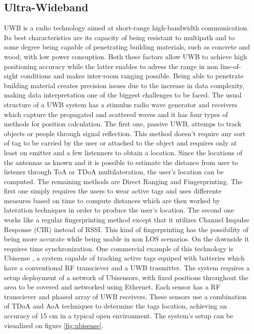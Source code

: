 \subsection{Ultra-Wideband}
\label{subsec:uwb}

\ac{UWB} is a radio technology aimed at short-range high-bandwidth communication. Its best characteristics are its capacity of being resistant to multipath and to some degree being capable of penetrating building materials, such as concrete and wood, with low power consuption. Both these factors allow \ac{UWB} to achieve high positioning accuracy while the latter enables to adress the range in non line-of-sight conditions and makes inter-room ranging possible. Being able to penetrate building material creates precision issues due to the increase in data complexity, making data interpretation one of the biggest challenges to be faced. The usual structure of a \ac{UWB} system has a stimulus radio wave generator and receivers which capture the propagated and scattered waves and it has four types of methods for position calculation.
The first one, passive \ac{UWB}, attemps to track objects or people through signal reflection. This method doesn't require any sort of tag to be carried by the user or attached to the object and requires only at least on emitter and a few listenners to obtain a location. Since the locations of the antennas as known and it is possible to estimate the distance from user to listener through \ac{ToA} or \ac{TDoA} multilateration, the user's location can be computed.
The remaining methods are Direct Ranging and Fingerprinting. The first one simply requires the users to wear active tags and uses differente measures based on time to compute distances which are then worked by lateration techniques in order to produce the user's location. The second one works like a regular fingerprinting method except that it utilizes Channel Impulse Response (CIR) instead of \ac{RSSI}. This kind of fingerprinting has the possibility of being more accurate while being usable in non \ac{LOS} scenarios. On the downside it requires time synchronization.
One commercial example of this technology is Ubisense \cite{ubisense}, a system capable of tracking active tags equiped with batteries which have a conventional RF transciever and a \ac{UWB} trasmitter. The system requires a setup deployment of a network of Ubisensors, with fixed positions throughout the area to be covered and networked using Ethernet. Each sensor has a RF transciever and  phased array of \ac{UWB} receivers. These sensors use a combination of \ac{TDoA} and \ac{AoA} techniques to determine the tags location, achieving an accuracy of 15 cm in a typical open environment. The system's setup can be visualized on figure \ref{fig:ubisense}.


